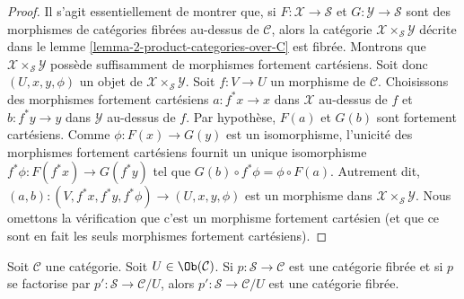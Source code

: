 \begin{proof}
Il s'agit essentiellement de montrer que, si
$F : \mathcal{X} \to \mathcal{S}$ et
$G : \mathcal{Y} \to \mathcal{S}$ sont des morphismes de catégories
fibrées au-dessus de $\mathcal{C}$, alors la catégorie
$\mathcal{X} \times_\mathcal{S} \mathcal{Y}$
décrite dans le lemme \ref{lemma-2-product-categories-over-C} est fibrée.
Montrons que $\mathcal{X} \times_\mathcal{S} \mathcal{Y}$
possède suffisamment de morphismes fortement cartésiens.
Soit donc $(U, x, y, \phi)$ un objet de
$\mathcal{X} \times_\mathcal{S} \mathcal{Y}$.
Soit $f : V \to U$ un morphisme de $\mathcal{C}$.
Choisissons des morphismes fortement cartésiens $a : f^*x \to x$ dans
$\mathcal{X}$ au-dessus de $f$ et $b : f^*y \to y$ dans $\mathcal{Y}$
au-dessus de $f$.
Par hypothèse, $F(a)$ et $G(b)$ sont fortement cartésiens.
Comme $\phi : F(x) \to G(y)$ est un isomorphisme, l'unicité des morphismes
fortement cartésiens fournit un unique isomorphisme
$f^*\phi : F(f^*x) \to G(f^*y)$ tel que
$G(b) \circ f^*\phi = \phi \circ F(a)$. Autrement dit,
$(a, b) : (V, f^*x, f^*y, f^*\phi) \to (U, x, y, \phi)$
est un morphisme dans $\mathcal{X} \times_\mathcal{S} \mathcal{Y}$.
Nous omettons la vérification que c'est un morphisme fortement cartésien
(et que ce sont en fait les seuls morphismes fortement cartésiens).
\end{proof}

\begin{lemma}
\label{lemma-cute}
Soit $\mathcal{C}$ une catégorie. Soit $U \in \Ob(\mathcal{C})$.
Si $p : \mathcal{S} \to \mathcal{C}$ est une catégorie fibrée
et si $p$ se factorise par $p' : \mathcal{S} \to \mathcal{C}/U$,
alors $p' : \mathcal{S} \to \mathcal{C}/U$ est une catégorie fibrée.
\end{lemma}

